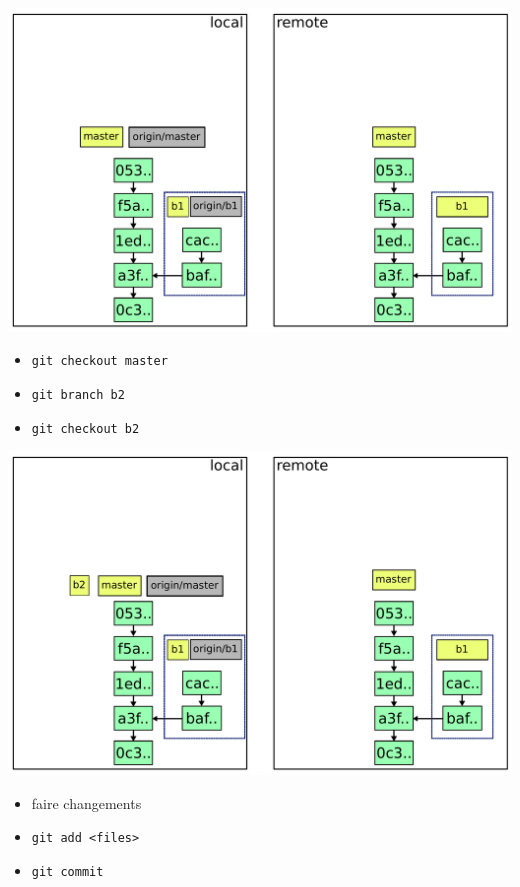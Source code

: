 \documentclass{beamer}
\begin{document}
\begin{frame}{}
  \includegraphics[width=\textwidth]{img/2.pdf}
\end{frame}

\begin{frame}{}
  \begin{itemize}
  \item \lstinline|git checkout master|
  \item \lstinline|git branch b2|
  \item \lstinline|git checkout b2|
  \end{itemize}
\end{frame}

\begin{frame}{}
  \includegraphics[width=\textwidth]{img/3.pdf}
\end{frame}

\begin{frame}{}
  \begin{itemize}
  \item faire changements
  \item \lstinline|git add <files>|
  \item \lstinline|git commit|
  \end{itemize}
\end{frame}
\end{document}
